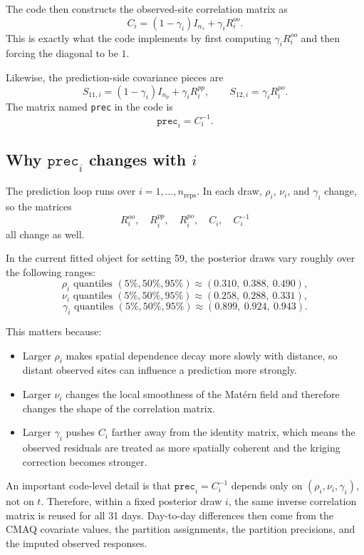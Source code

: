 \documentclass[11pt]{article}
\begin{document}
The code then constructs the observed-site correlation matrix as
\[
C_i = (1-\gamma_i) I_{n_s} + \gamma_i R^{oo}_i.
\]
This is exactly what the code implements by first computing
\(\gamma_i R^{oo}_i\) and then forcing the diagonal to be \(1\).

Likewise, the prediction-side covariance pieces are
\[
S_{11,i} = (1-\gamma_i) I_{n_p} + \gamma_i R^{pp}_i,
\qquad
S_{12,i} = \gamma_i R^{po}_i.
\]
The matrix named \texttt{prec} in the code is
\[
\texttt{prec}_i = C_i^{-1}.
\]

\subsection*{Why \(\texttt{prec}_i\) changes with \(i\)}

The prediction loop runs over \(i = 1,\dots,n_{\text{reps}}\). In each draw,
\(\rho_i\), \(\nu_i\), and \(\gamma_i\) change, so the matrices
\[
R^{oo}_i, \quad R^{pp}_i, \quad R^{po}_i, \quad C_i, \quad C_i^{-1}
\]
all change as well.

In the current fitted object for setting 59, the posterior draws vary roughly
over the following ranges:
\[
\rho_i \text{ quantiles } (5\%, 50\%, 95\%) \approx
(0.310,\ 0.388,\ 0.490),
\]
\[
\nu_i \text{ quantiles } (5\%, 50\%, 95\%) \approx
(0.258,\ 0.288,\ 0.331),
\]
\[
\gamma_i \text{ quantiles } (5\%, 50\%, 95\%) \approx
(0.899,\ 0.924,\ 0.943).
\]

This matters because:
\begin{itemize}
\item Larger \(\rho_i\) makes spatial dependence decay more slowly with
distance, so distant observed sites can influence a prediction more strongly.
\item Larger \(\nu_i\) changes the local smoothness of the Mat\'ern field and
therefore changes the shape of the correlation matrix.
\item Larger \(\gamma_i\) pushes \(C_i\) farther away from the identity matrix,
which means the observed residuals are treated as more spatially coherent and
the kriging correction becomes stronger.
\end{itemize}

An important code-level detail is that \(\texttt{prec}_i = C_i^{-1}\) depends
only on \((\rho_i,\nu_i,\gamma_i)\), not on \(t\). Therefore, within a fixed
posterior draw \(i\), the same inverse correlation matrix is reused for all 31
days. Day-to-day differences then come from the CMAQ covariate values, the
partition assignments, the partition precisions, and the imputed observed
responses.
\end{document}
